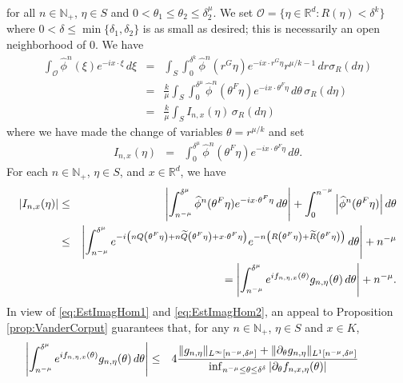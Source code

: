 \documentclass[smallextended]{svjour3}
\theoremstyle{remark}
\renewenvironment{proof}[1][\proofname]{\renewcommand\xproofname{#1}\xproof}{\endxproof}
\begin{document}
\begin{proof}
for all $n\in\mathbb{N}_+$, $\eta\in S$ and $0<\theta_1\leq\theta_2\leq\delta_2^{\mu}$. We set $\mathcal{O}=\{\eta\in\mathbb{R}^d:R(\eta)<\delta^k\}$
where $0<\delta\leq \min\{\delta_1,\delta_2\}$ is as small as desired; this is necessarily an open neighborhood of $0$. We have
\begin{eqnarray*}
    \int_{\mathcal{O}}\widehat{\phi}^n(\xi)e^{-ix\cdot\xi}\,d\xi
    &=&
    \int_S\int_0^{\delta^{k}}\widehat{\phi}^n(r^G\eta)e^{-ix\cdot r^G\eta}r^{\mu/k-1}\,dr \sigma_R(d\eta)\\
    &=&
    \frac{k}{\mu}\int_S \int_0^{\delta^{\mu}} \widehat{\phi}^n(\theta^{F} \eta) e^{-i x\cdot\theta^F \eta}  \,d\theta \,\sigma_R(d\eta)\\
    &=&
    \frac{k}{\mu}\int_S I_{n,x}(\eta)\,\sigma_R(d\eta)
\end{eqnarray*}
where we have made the change of variables $\theta=r^{\mu/ k}$ and set
\begin{eqnarray*}
    I_{n,x}(\eta)&=&\int_0^{\delta^{\mu}}\widehat{\phi}^n(\theta^F\eta)e^{-ix\cdot\theta^F\eta}\,d\theta.
\end{eqnarray*}
For each $n\in\mathbb{N}_+$, $\eta\in S$, and $x\in\mathbb{R}^d$, we have
\begin{eqnarray*}
\abs{I_{n,x}(\eta)}
&\leq & 
\abs{\int_{n^{-\mu}}^{\delta^{\mu}}\widehat{\phi}^n(\theta^F\eta)e^{-ix\cdot\theta^F\eta}\,d\theta} +\int_{0}^{n^{-\mu}}\abs{\widehat{\phi}^n(\theta^F\eta)}\,d\theta\\
&\leq& \abs{\int_{n^{-\mu}}^{\delta^\mu} e^{-i\left(nQ\left(\theta^F\eta\right)+n\widetilde{Q}\left(\theta^F\eta\right)+x\cdot\theta^F\eta\right)}e^{-n\left(R\left(\theta^F\eta\right)+\widetilde{R}\left(\theta^F\eta\right)\right)}\,d\theta}+n^{-\mu}\\
& &\hspace{1cm}=\abs{\int_{n^{-\mu}}^{\delta^\mu} e^{i f_{n,\eta,x}(\theta) } g_{n,\eta}(\theta)\,d\theta} 
+ n^{-\mu}.
\end{eqnarray*}
In view of \eqref{eq:EstImagHom1} and \eqref{eq:EstImagHom2}, an appeal to Proposition \ref{prop:VanderCorput} guarantees that, for any $n\in\mathbb{N}_+$, $\eta\in S$ and $x\in K$,
\begin{eqnarray*}
 \hspace{-1cm}\abs{\int_{n^{-\mu}}^{\delta^\mu}e^{if_{n,\eta,x}(\theta)}g_{n,\eta}(\theta)\,d\theta}
    &\leq& 
    4
    \frac{ 
    \|g_{n,\eta}\|_{L^\infty[n^{-\mu},\delta^{\mu}]}
    +
    \|\partial_{\theta}g_{n,\eta}\|_{L^1[n^{-\mu},\delta^{\mu}]}
    }{
    \inf_{n^{-\mu}\leq\theta\leq \delta^{\delta}}|\partial_{\theta}f_{n,x,\eta}(\theta)|
}
\end{eqnarray*}
\end{proof}
\end{document}
